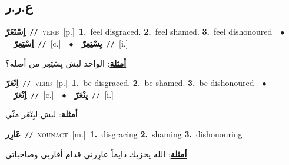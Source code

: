 \documentclass[10pt,a4paper,twoside]{article} %
\begin{document}
\begin{multicols}{2}
\vspace{-3mm}
\subsection*{\color{blue}\foreignlanguage{arabic}{ع.ر.ر}\color{blue}{}} 

{\setlength\topsep{0pt}\textbf{\foreignlanguage{arabic}{اِسْتَعَرّ}}\ {\color{gray}\texttt{//}\color{black}}\ \textsc{verb}\ [p.]\ \textbf{1.}~feel disgraced.  \textbf{2.}~feel shamed.  \textbf{3.}~feel dishonoured\ \ $\bullet$\ \ \setlength\topsep{0pt}\textbf{\foreignlanguage{arabic}{اِسْتِعِرّ}}\ {\color{gray}\texttt{//}\color{black}}\ [c.]\ \ $\bullet$\ \ \setlength\topsep{0pt}\textbf{\foreignlanguage{arabic}{يِسْتِعِرّ}}\ {\color{gray}\texttt{//}\color{black}}\ [i.]\  \begin{flushright}\color{gray}\foreignlanguage{arabic}{\textbf{\underline{\foreignlanguage{arabic}{أمثلة}}}: الواحد ليش يِسْتِعِر من أصله؟}\end{flushright}\color{black}} \vspace{2mm}

{\setlength\topsep{0pt}\textbf{\foreignlanguage{arabic}{اِنْعَرّ}}\ {\color{gray}\texttt{//}\color{black}}\ \textsc{verb}\ [p.]\ \textbf{1.}~be disgraced.  \textbf{2.}~be shamed.  \textbf{3.}~be dishonoured\ \ $\bullet$\ \ \setlength\topsep{0pt}\textbf{\foreignlanguage{arabic}{اِنْعَرّ}}\ {\color{gray}\texttt{//}\color{black}}\ [c.]\ \ $\bullet$\ \ \setlength\topsep{0pt}\textbf{\foreignlanguage{arabic}{يِنْعَرّ}}\ {\color{gray}\texttt{//}\color{black}}\ [i.]\  \begin{flushright}\color{gray}\foreignlanguage{arabic}{\textbf{\underline{\foreignlanguage{arabic}{أمثلة}}}: ليش ليِنْعَر منِّي}\end{flushright}\color{black}} \vspace{2mm}

{\setlength\topsep{0pt}\textbf{\foreignlanguage{arabic}{عَارِر}}\ {\color{gray}\texttt{//}\color{black}}\ \textsc{noun\textunderscore act}\ [m.]\ \textbf{1.}~disgracing  \textbf{2.}~shaming  \textbf{3.}~dishonouring\  \begin{flushright}\color{gray}\foreignlanguage{arabic}{\textbf{\underline{\foreignlanguage{arabic}{أمثلة}}}: الله يخزيك دايماً عارِرني قدام أقاربي وصاحباتي}\end{flushright}\color{black}} \vspace{2mm}


\end{multicols}
\end{document}
